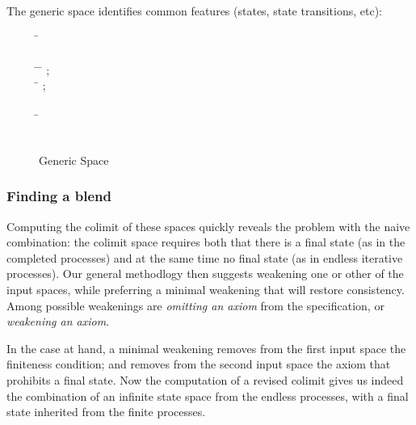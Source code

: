 The generic space identifies common features (states, state transitions, etc):

\begin{figure}[ht!]
  \begin{hetcasl}
   \SPEC \= \Ax{=}\\
\> \SORT {}\\
\> \PREDS \= \Ax{:} \= \Ax{\times} ;\\
\>\>  \Ax{:} \= \Ax{\times} ;\\
\>\>  \Ax{:} \\
\> \OP \= \Ax{:} \\
\\
  \end{hetcasl}
  
  \caption{Generic Space}
\end{figure}

\subsubsection{Finding a blend}

Computing the colimit of these spaces quickly reveals the problem with
the naive combination: the colimit space requires both that there is
a final state (as in the completed processes) and at the same time
no final state (as in endless iterative processes).  Our general
methodlogy then suggests weakening one or other of the input spaces,
while preferring a minimal weakening that will restore consistency.
Among possible weakenings are \emph{omitting an axiom} from
the specification, or \emph{weakening an axiom}.

In the case at hand, a minimal weakening removes from the first input
space the finiteness condition;  and removes from the second input space
the axiom that prohibits a final state.  Now the computation of
a revised colimit gives us indeed the combination of an infinite
state space from the endless processes, with a final state inherited
from the finite processes.  

